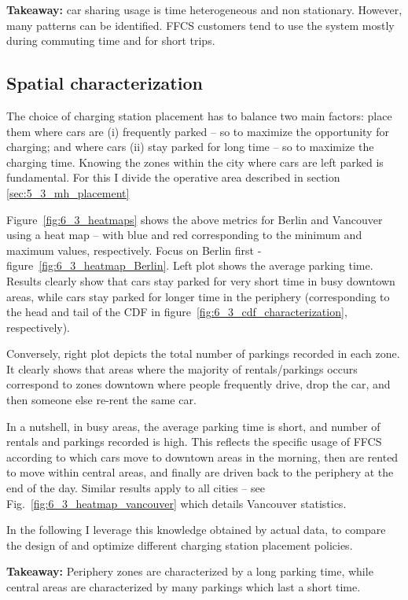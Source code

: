 \textbf{Takeaway:} car sharing usage is time heterogeneous and non stationary. However, many patterns can be identified. FFCS customers tend to use the system mostly during commuting time and for short trips.

\subsection{Spatial characterization}
\label{sec:dataspace}
The choice of charging station placement has to balance two main factors: place them where cars are (i) frequently parked -- so to maximize the opportunity for charging; and where cars (ii) stay parked for long time -- so to maximize the charging time. Knowing the zones within the city where cars are left parked is fundamental. For this I divide the operative area described in section \ref{sec:5_3_mh_placement}

Figure~\ref{fig:6_3_heatmaps} shows the above metrics for Berlin and Vancouver using a heat map -- with blue and red corresponding to the minimum and maximum values, respectively. Focus on Berlin first - figure~\ref{fig:6_3_heatmap_Berlin}. Left plot shows the average parking time. Results clearly show that cars stay parked for very short time in busy downtown areas, while cars stay parked for longer time in the periphery (corresponding to the head and tail of the CDF in figure~\ref{fig:6_3_cdf_characterization}, respectively).

Conversely, right plot depicts the total number of parkings recorded in each zone. It clearly shows that areas where the majority of rentals/parkings occurs correspond to zones downtown where people frequently drive, drop the car, and then someone else re-rent the same car. 

In a nutshell, in busy areas, the average parking time is short, and number of rentals and parkings recorded is high. This reflects the specific usage of FFCS according to which cars move to downtown areas in the morning, then are rented to move within central areas, and finally are driven back to the periphery at the end of the day.
Similar results apply to all cities -- see Fig.~\ref{fig:6_3_heatmap_vancouver} which details Vancouver statistics.

In the following I leverage this knowledge obtained by actual data, to compare the design of and optimize different charging station placement policies.


\textbf{Takeaway:} Periphery zones are characterized by a long parking time, while central areas are characterized by many parkings which last a short time.


